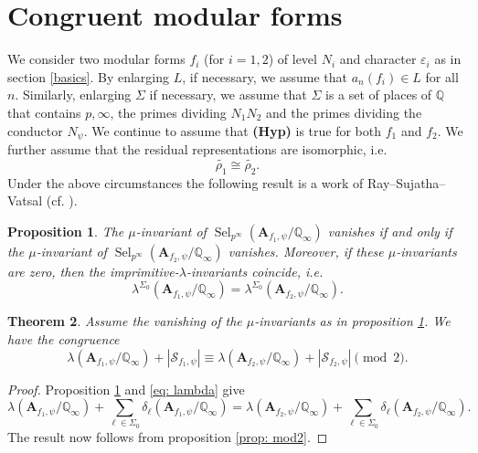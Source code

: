 \documentclass{amsart}
\newtheorem{theorem}{Theorem}[section]
\newcommand{\Q}{\mathbb{Q}}
\newcommand{\bA}{\mathbf{A}}
\newcommand{\Sel}{\operatorname{Sel}}
\newtheorem{auxiliary proposition}[theorem]{Auxiliary Proposition}
\newtheorem{main conjecture}[theorem]{Main Conjecture}
\newtheorem{main theorem}[theorem]{Main Theorem}
\newtheorem{modesty proposition}[theorem]{Modesty Proposition}
\newtheorem{open problem}[theorem]{Open Problem}
\newtheorem{proposition}[theorem]{Proposition}
\newtheorem{convergence lemma}[theorem]{Convergence Lemma}
\newtheorem{corrected lemma}[theorem]{Corrected Lemma}
\newtheorem{growth lemma}[theorem]{Growth Lemma}
\newtheorem{coefficient lemma}[theorem]{Integrality Lemma}
\newtheorem{interpolation lemma}[theorem]{Interpolation Lemma}
\newtheorem{kernel lemma}[theorem]{Kernel Lemma}
\newtheorem{limit lemma}[theorem]{Limit Lemma}
\newtheorem{tandem lemma}[theorem]{Modesty Lemma}
\newtheorem{zero-finding lemma}[theorem]{Zero-Finding Lemma}
\begin{document}
\section{Congruent modular forms}\label{sec:congruent}
We consider two modular forms $f_i$ (for $i=1,2$) of level $N_i$ and character $\varepsilon_i$ as in section \ref{basics}. By enlarging $L$, if necessary, we assume that $a_n(f_i) \in L$ for all $n$. Similarly, enlarging $\Sigma$ if necessary, we assume that $\Sigma$ is a set of places of $\Q$ that contains $p, \infty$, the primes dividing $N_1N_2$ and  the primes dividing the conductor $N_\psi$. We continue to assume that \textbf{(Hyp)} is true for both $f_1$ and $f_2$. We further assume 
that the residual representations are isomorphic, i.e. 
$$\tilde{\rho_1}\cong \tilde{\rho_2}.$$ Under the above circumstances the following result is a work of Ray--Sujatha--Vatsal (cf. \cite[Proposition 3.11]{RaySujathaVatsal}).
\begin{proposition}\label{prop:Anwesh}
The $\mu$-invariant of $\Sel_{p^\infty}(\bA_{f_1, \psi}/\Q_\infty)$ vanishes if and only if the $\mu$-invariant of $\Sel_{p^\infty}(\bA_{f_2, \psi}/\Q_\infty)$ vanishes. Moreover, if these $\mu$-invariants are zero, then the imprimitive-$\lambda$-invariants coincide, i.e.
$$\lambda^{\Sigma_0}(\bA_{f_1, \psi}/\Q_\infty)=\lambda^{\Sigma_0}(\bA_{f_2, \psi}/\Q_\infty).$$
\end{proposition}
\begin{theorem}\label{Mainthm} Assume the vanishing of the $\mu$-invariants as in proposition \ref{prop:Anwesh}.
    We have the congruence
    $$\lambda(\bA_{f_1, \psi}/\Q_\infty) +|\mathcal{S}_{f_1,\psi}|\equiv \lambda(\bA_{f_2, \psi}/\Q_\infty)+|\mathcal{S}_{f_2,\psi}| \pmod{2}.$$
\end{theorem}
\begin{proof}
     Proposition \ref{prop:Anwesh} and \eqref{eq: lambda} give $$\lambda(\bA_{f_1,\psi}/\Q_\infty) +\sum_{\ell \in \Sigma_0}\delta_\ell(\bA_{f_1,\psi}/\Q_\infty)=\lambda(\bA_{f_2,\psi}/\Q_\infty) +\sum_{\ell \in \Sigma_0}\delta_\ell(\bA_{f_2,\psi}/\Q_\infty).$$
     The result now follows from proposition \ref{prop: mod2}.
\end{proof}
\end{document}
